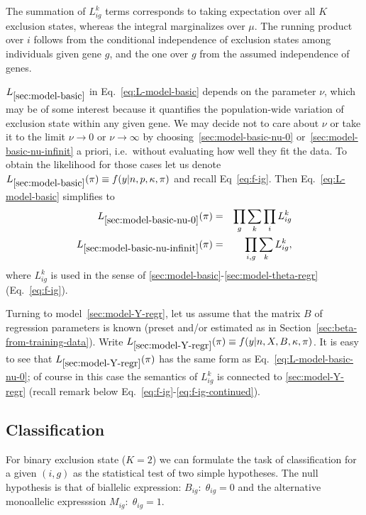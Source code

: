 \documentclass[letterpaper]{article}
\begin{document}
The summation of \(L_{ig}^k\) terms corresponds to taking expectation over all
\(K\) exclusion states, whereas the integral marginalizes over \(\mu\).  The
running product over \(i\) follows from the conditional independence of
exclusion states among individuals given gene \(g\), and the one over \(g\)
from the assumed independence of genes.

\(L_{\ref{sec:model-basic}}\) in Eq.~\ref{eq:L-model-basic} depends on the parameter \(\nu\), which
may be of some interest because it quantifies the population-wide variation of
exclusion state within any given gene.  We may decide not to care about \(\nu\) or take
it to the limit \(\nu\rightarrow 0\) or \(\nu\rightarrow \infty\) by
choosing~\ref{sec:model-basic-nu-0} or~\ref{sec:model-basic-nu-infinit} a
priori, i.e.~without evaluating how well they fit the data.  To obtain the
likelihood for those cases let us denote \(L_{\ref{sec:model-basic}}(\pi)\equiv
f(y|n,p,\kappa,\pi)\) and recall Eq~\ref{eq:f-ig}.  Then
Eq.~\ref{eq:L-model-basic} simplifies to
\begin{eqnarray}
\label{eq:L-model-basic-nu-0}
L_{\ref{sec:model-basic-nu-0}}(\pi) &=&
\prod_{g}
\sum_k \prod_i L_{ig}^k
\\
\label{eq:L-model-basic-nu-infinit}
L_{\ref{sec:model-basic-nu-infinit}}(\pi) &=&
\prod_{i,g}
\sum_k L_{ig}^k,
\end{eqnarray}
where \(L_{ig}^k\) is used in the sense of
\ref{sec:model-basic}-\ref{sec:model-theta-regr} (Eq.~\ref{eq:f-ig}).

Turning to model~\ref{sec:model-Y-regr}, let us assume that the matrix \(B\)
of regression parameters is known (preset and/or estimated as in
Section~\ref{sec:beta-from-training-data}).  Write
\(L_{\ref{sec:model-Y-regr}}(\pi)\equiv f(y|n,X,B,\kappa,\pi)\).  It is easy
to see that \(L_{\ref{sec:model-Y-regr}}(\pi)\) has the same form as
Eq.~\ref{eq:L-model-basic-nu-0}; of course in this case the semantics of
\(L_{ig}^k\) is connected to \ref{sec:model-Y-regr} (recall remark below
Eq.~\ref{eq:f-ig}-\ref{eq:f-ig-continued}).

\subsection{Classification}
\label{sec:classification}

For binary exclusion state (\(K=2\)) we can
formulate the task of classification for a given \((i,g)\) as the statistical test of two simple
hypotheses.  The null hypothesis is that of biallelic expression: \(B_{ig} :\;
\theta_{ig}=0\) and the alternative monoallelic expresssion \(M_{ig} :\; \theta_{ig}=1\).
\end{document}
